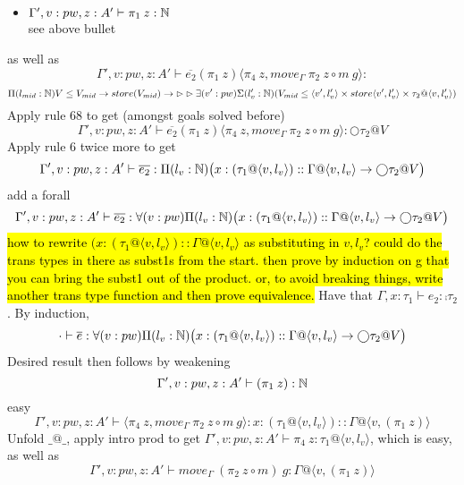 \documentclass{article}
\begin{document}
\begin{itemize}
\begin{itemize}
\begin{itemize}
\begin{itemize}
        \item $\Gamma', v: pw, z:A'  \vdash \pi_1 \: z : \mathbb{N} $\\
        see above bullet
    \end{itemize}
    as well as
    \[\Gamma', v: pw, z:A'  \vdash \overline{e_2} (\pi_1 \: z)
\langle \pi_4 \: z, move_\Gamma \: \pi_2 \: z \circ m \: g \rangle :\] 
    \[\Pi(l_{mid} : \mathbb{N}) V \leq V_{mid} \rightarrow store(V_{mid}) \rightarrow \rhd \rhd 
    \exists(v': pw)\Sigma(l_v' : \mathbb{N})(V_{mid} \leq \langle v', l_v' \rangle \times store\langle v', l_v' \rangle \times \tau_2 @ \langle v, l_v' \rangle)\]
    Apply rule 68 to get (amongst goals solved before)
        \[\Gamma', v: pw, z:A'  \vdash \overline{e_2} (\pi_1 \: z)
\langle \pi_4 \: z, move_{\Gamma} \: \pi_2 \: z \circ m \: g \rangle  : \bigcirc \tau_2 @ V\] 
    Apply rule 6 twice more to get
        \[\Gamma', v: pw, z:A'  \vdash \overline{e_2} :\Pi(l_v: \mathbb{N})\big(x:(\tau_1 @ \langle v, l_v \rangle)::\Gamma @ \langle v, l_v \rangle \rightarrow \bigcirc \tau_2 @ V\big)\]
        add a forall
         \[\Gamma', v: pw, z:A'  \vdash \overline{e_2} :
         \forall(v: pw)\Pi(l_v: \mathbb{N})\big(x:(\tau_1 @ \langle v, l_v \rangle)::\Gamma @ \langle v, l_v \rangle \rightarrow \bigcirc \tau_2 @ V\big)\]
       \hl{how to rewrite $(x:(\tau_1 @ \langle v, l_v \rangle)::\Gamma @ \langle v, l_v \rangle$ as substituting in $v, l_v$?
        could do the trans types in there as subst1s from the start. then prove by induction on g that you can bring the subst1 out of the product.
        or, to avoid breaking things, write another trans type function and then prove equivalence.}
        Have that
        $\Gamma, x:\tau_1  \vdash e_2 : \comp \tau_2$. By induction,
        \[\cdot \vdash \overline{e}: \forall(v: pw)\Pi(l_v: \mathbb{N})\big(x:(\tau_1 @ \langle v, l_v \rangle)::\Gamma @ \langle v, l_v \rangle \rightarrow \bigcirc \tau_2 @ V\big)\]
     Desired result then follows by weakening
        \[\Gamma', v: pw, z:A'  \vdash (\pi_1 \: z) : \mathbb{N}\]
        easy
       \[\Gamma', v: pw, z:A'  \vdash \langle \pi_4 \: z, move_\Gamma \: \pi_2 \: z \circ m \: g \rangle : 
 x:(\tau_1 @ \langle v, l_v \rangle)::\Gamma @ \langle v, (\pi_1 \: z) \rangle
        \]
        Unfold $\_ @ \_$, apply intro prod to get $\Gamma', v: pw, z:A'  \vdash \pi_4 \: z : \tau_1 @ \langle v, l_v \rangle$, which is easy, as well as
 \[\Gamma', v: pw, z:A'  \vdash move_\Gamma \: (\pi_2 \: z \circ m) \: g: \Gamma @ \langle v, (\pi_1 \: z) \rangle\]

\end{itemize}
\end{itemize}
\end{itemize}
\end{document}
